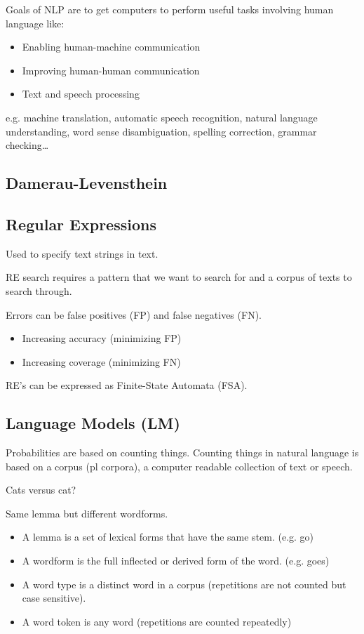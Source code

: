 Goals of NLP are to get computers to perform useful tasks involving human language like:
\begin{itemize}
  \item Enabling human-machine communication
  \item Improving human-human communication
  \item Text and speech processing
\end{itemize}

e.g. machine translation, automatic speech recognition, natural language understanding, word sense disambiguation, spelling correction, grammar checking…

\subsection{Damerau-Levensthein}

\subsection*{Regular Expressions}

Used to specify text strings in text.

RE search requires a pattern that we want to search for and a corpus of texts to search through.

Errors can be false positives (FP) and false negatives (FN).

\begin{itemize}
  \item Increasing accuracy (minimizing FP)
  \item Increasing coverage (minimizing FN)
\end{itemize}

RE's can be expressed as Finite-State Automata (FSA).

\subsection*{Language Models (LM)}

Probabilities are based on counting things. Counting things in natural language is based on a corpus (pl corpora), a computer readable collection of text or speech.

Cats versus cat?

Same lemma but different wordforms.

\begin{itemize}
  \item A lemma is a set of lexical forms that have the same stem. (e.g. go)
  \item A wordform is the full inflected or derived form of the word. (e.g. goes)
  \item A word type is a distinct word in a corpus (repetitions are not counted but case sensitive).
  \item A word token is any word (repetitions are counted repeatedly)
\end{itemize}


